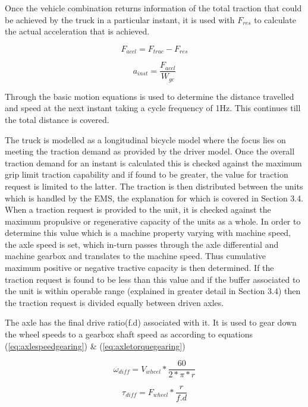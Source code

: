 \documentclass[MastersThesis.tex]{subfiles}
\begin{document}
Once the vehicle combination returns information of the total traction that could be achieved by the truck in a particular instant, it is used with $F_{res}$ to calculate the actual acceleration that is achieved.
 
\begin{equation} \label{eq:acclforce}
F_{accl}=F_{trac}-F_{res}
\end{equation} 

\begin{equation} \label{eq:acclinstant}
a_{inst}=\frac{F_{accl}}{W_{gc}}
\end{equation} 

Through the basic motion equations is used to determine the distance travelled and speed at the next instant taking a cycle frequency of 1Hz. This continues till the total distance is covered. 

The truck is modelled as a longitudinal bicycle model where the focus lies on meeting the traction demand as provided by the driver model. Once the overall traction demand for an instant is calculated this is checked against the maximum grip limit traction capability and if found to be greater, the value for traction request is limited to the latter. The traction is then distributed between the units which is handled by the EMS, the explanation for which is covered in Section 3.4. When a traction request is provided to the unit, it is checked against the maximum propulsive or regenerative capacity of the units as a whole. In order to determine this value which is a machine property varying with machine speed, the axle speed is set, which in-turn passes through the axle differential and machine gearbox and translates to the machine speed. Thus cumulative maximum positive or negative tractive capacity is then determined. If the traction request is found to be less than this value and if the buffer associated to the unit is within operable range (explained in greater detail in Section 3.4) then the traction request is divided equally between driven axles.

The axle has the final drive ratio(f.d) associated with it. It is used to gear down the wheel speeds to a gearbox shaft speed as according to equations (\ref{eq:axlespeedgearing}) \&  (\ref{eq:axletorquegearing})

\begin{equation} \label{eq:axlespeedgearing}
 \omega_{diff} =V_{wheel}*\frac{60}{2*\pi*r}
\end{equation}

\begin{equation} \label{eq:axletorquegearing}
\tau_{diff}=F_{wheel}*\frac{r}{f.d} 
\end{equation}
\end{document}
